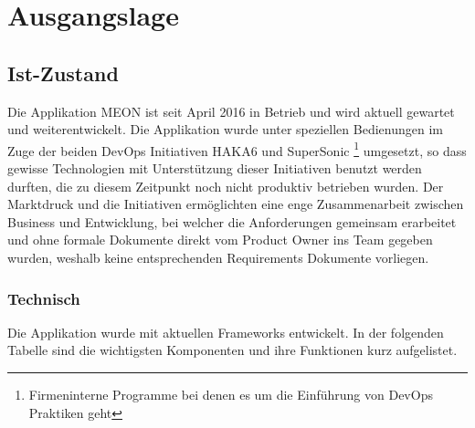 \graphicspath{{./images/}}

\chapter{Ausgangslage}

\section{Ist-Zustand}

Die Applikation MEON ist seit April 2016 in Betrieb und wird aktuell gewartet und weiterentwickelt. Die Applikation wurde unter speziellen Bedienungen im Zuge der beiden DevOps Initiativen HAKA6 und SuperSonic \footnote{Firmeninterne Programme bei denen es um die Einführung von DevOps Praktiken geht} umgesetzt, so dass gewisse Technologien mit Unterstützung dieser Initiativen benutzt werden durften, die zu diesem Zeitpunkt noch nicht produktiv betrieben wurden. Der Marktdruck und die Initiativen ermöglichten eine enge Zusammenarbeit zwischen Business und Entwicklung, bei welcher die Anforderungen gemeinsam erarbeitet und ohne formale Dokumente direkt vom Product Owner ins Team gegeben wurden, weshalb keine entsprechenden Requirements Dokumente vorliegen.
\newpage
\subsection{Technisch}

Die Applikation wurde mit aktuellen Frameworks entwickelt. In der folgenden Tabelle sind die wichtigsten Komponenten und ihre Funktionen kurz aufgelistet.

